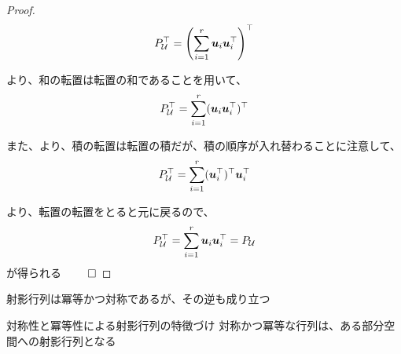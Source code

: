 \documentclass[../../../topic_linear-algebra]{subfiles}
\begin{document}
\begin{proof}
  \begin{equation*}
    P_{\mathcal{U}}^\top = \left( \sum_{i=1}^{r} \vb*{u}_i\vb*{u}_i^\top \right)^\top
  \end{equation*}

  より、和の転置は転置の和であることを用いて、
  \begin{equation*}
    P_{\mathcal{U}}^\top = \sum_{i=1}^{r} (\vb*{u}_i\vb*{u}_i^\top)^\top
  \end{equation*}

  また、より、積の転置は転置の積だが、積の順序が入れ替わることに注意して、
  \begin{equation*}
    P_{\mathcal{U}}^\top = \sum_{i=1}^{r} (\vb*{u}_i^\top)^\top \vb*{u}_i^\top
  \end{equation*}

  より、転置の転置をとると元に戻るので、
  \begin{equation*}
    P_{\mathcal{U}}^\top = \sum_{i=1}^{r} \vb*{u}_i \vb*{u}_i^\top = P_{\mathcal{U}}
  \end{equation*}
  が得られる $\qed$
\end{proof}

\sectionline

射影行列は冪等かつ対称であるが、その逆も成り立つ

\begin{theorem*}{対称性と冪等性による射影行列の特徴づけ}
  対称かつ冪等な行列は、ある部分空間への射影行列となる
\end{theorem*}
\end{document}
